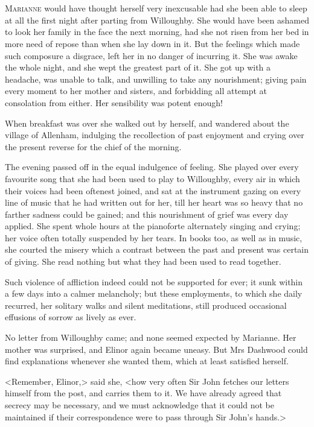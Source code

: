 \chapter[Chapter \thechapter]{}
\lettrine[lraise=0.3]{M}{arianne} would have thought herself very inexcusable had she been able to sleep at all the first night after parting from Willoughby. She would have been ashamed to look her family in the face the next morning, had she not risen from her bed in more need of repose than when she lay down in it. But the feelings which made such composure a disgrace, left her in no danger of incurring it. She was awake the whole night, and she wept the greatest part of it. She got up with a headache, was unable to talk, and unwilling to take any nourishment; giving pain every moment to her mother and sisters, and forbidding all attempt at consolation from either. Her sensibility was potent enough!

When breakfast was over she walked out by herself, and wandered about the village of Allenham, indulging the recollection of past enjoyment and crying over the present reverse for the chief of the morning.

The evening passed off in the equal indulgence of feeling. She played over every favourite song that she had been used to play to Willoughby, every air in which their voices had been oftenest joined, and sat at the instrument gazing on every line of music that he had written out for her, till her heart was so heavy that no farther sadness could be gained; and this nourishment of grief was every day applied. She spent whole hours at the pianoforte alternately singing and crying; her voice often totally suspended by her tears. In books too, as well as in music, she courted the misery which a contrast between the past and present was certain of giving. She read nothing but what they had been used to read together.

Such violence of affliction indeed could not be supported for ever; it sunk within a few days into a calmer melancholy; but these employments, to which she daily recurred, her solitary walks and silent meditations, still produced occasional effusions of sorrow as lively as ever.

No letter from Willoughby came; and none seemed expected by Marianne. Her mother was surprised, and Elinor again became uneasy. But Mrs Dashwood could find explanations whenever she wanted them, which at least satisfied herself.

<Remember, Elinor,> said she, <how very often Sir John fetches our letters himself from the post, and carries them to it. We have already agreed that secrecy may be necessary, and we must acknowledge that it could not be maintained if their correspondence were to pass through Sir John's hands.>

